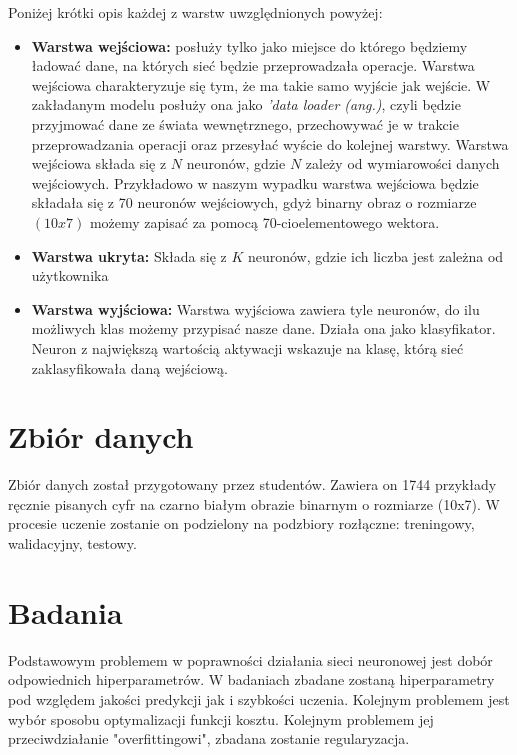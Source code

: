 \documentclass{article}
\begin{document}
	Poniżej krótki opis każdej z warstw uwzględnionych powyżej:
	\begin{itemize}
		\item \textbf{Warstwa wejściowa:} posłuży tylko jako miejsce do którego będziemy ładować dane, na których sieć będzie przeprowadzała operacje. Warstwa wejściowa charakteryzuje się tym, że ma takie samo wyjście jak wejście. W zakładanym modelu posłuży ona jako \textit{'data loader (ang.)}, czyli będzie przyjmować dane ze świata wewnętrznego, przechowywać je w trakcie przeprowadzania operacji oraz przesyłać wyście do kolejnej warstwy. Warstwa wejściowa składa się z $N$ neuronów, gdzie $N$ zależy od wymiarowości danych wejściowych. Przykładowo w naszym wypadku warstwa wejściowa będzie składała się z 70 neuronów wejściowych, gdyż binarny obraz o rozmiarze $(10x7)$ możemy zapisać za pomocą 70-cioelementowego wektora. 
		
	\item \textbf{Warstwa ukryta:} Składa się z $K$ neuronów, gdzie ich liczba jest zależna od użytkownika 
	
	\item \textbf{Warstwa wyjściowa: }Warstwa wyjściowa zawiera tyle neuronów, do ilu możliwych klas możemy przypisać nasze dane. Działa ona jako klasyfikator. Neuron z największą wartością aktywacji wskazuje na klasę, którą sieć zaklasyfikowała daną wejściową. 
	\end{itemize}
	
    
    \newpage
	\section{Zbiór danych}
	Zbiór danych został przygotowany przez studentów. Zawiera on 1744 przykłady ręcznie pisanych cyfr na czarno białym obrazie binarnym o rozmiarze (10x7). W procesie uczenie zostanie on podzielony na podzbiory rozłączne: treningowy, walidacyjny, testowy.
	
	\newpage
	\section{Badania}
	Podstawowym problemem w poprawności działania sieci neuronowej jest dobór odpowiednich hiperparametrów. W badaniach zbadane zostaną hiperparametry pod względem jakości predykcji jak i szybkości uczenia. Kolejnym problemem jest wybór sposobu optymalizacji funkcji kosztu. Kolejnym problemem jej przeciwdziałanie "overfittingowi", zbadana zostanie regularyzacja. 
	
\end{document}
